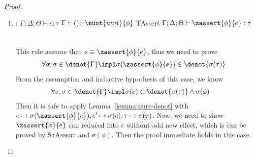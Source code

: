 \begin{proof}
\begin{enumerate}[label=Case]
\item:
{\footnotesize
\mprooftr{45mm}
{$\Gamma;\Delta;\Theta \vdash e : \tau$ \quad
$\Gamma \vdash () : \nuot{unit}{\phi}$}
{TAssert}
{$\Gamma;\Delta;\Theta \vdash \zassert{\phi}{e} : \tau  $}
\ \\ \ \\}
This rule assume that $e \equiv \zassert{\phi}{e}$, thus we need to prove
{\footnotesize\begin{align*}
    \forall \sigma, \sigma \in \denot{\Gamma} \impl \sigma(\zassert{\phi}{e}) \in \denot{\sigma(\tau)}
\end{align*}}\noindent
From the assumption and inductive hypothesis of this case, we know
{\footnotesize\begin{align*}
    &\forall \sigma, \sigma \in \denot{\Gamma} \impl \sigma(e) \in \denot{\sigma(\tau)} \land \sigma(\phi)
\end{align*}}\noindent
Then it is safe to apply Lemma~\ref{lemma:pure-denot} with $e \mapsto \sigma(\zassert{\phi}{e}), e' \mapsto \sigma(e), \tau \mapsto \sigma(\tau)$.
Now, we need to show $\zassert{\phi}{e}$ can reduced into $e$ without add new effect, which is can be proved by \textsc{StAssert} and $\sigma(\phi)$. Then the proof immediate holds in this case.


\end{enumerate}
\end{proof}
